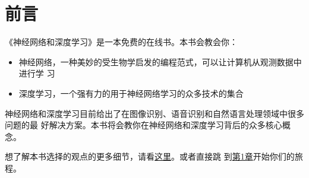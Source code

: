 
\chapter{前言}
\label{chap:Introduction}

《神经网络和深度学习》是一本免费的在线书。本书会教会你：

\begin{itemize}
\item 神经网络，一种美妙的受生物学启发的编程范式，可以让计算机从观测数据中进行学
  习
\item 深度学习，一个强有力的用于神经网络学习的众多技术的集合
\end{itemize}

神经网络和深度学习目前给出了在图像识别、语音识别和自然语言处理领域中很多问题的最
好解决方案。本书将会教你在神经网络和深度学习背后的众多核心概念。

想了解本书选择的观点的更多细节，请看\hyperref[ch:About]{这里}。或者直接跳
到\hyperref[ch:UsingNeuralNetsToRecognizeHandwrittenDigits]{第1章}开始你们的旅
程。

